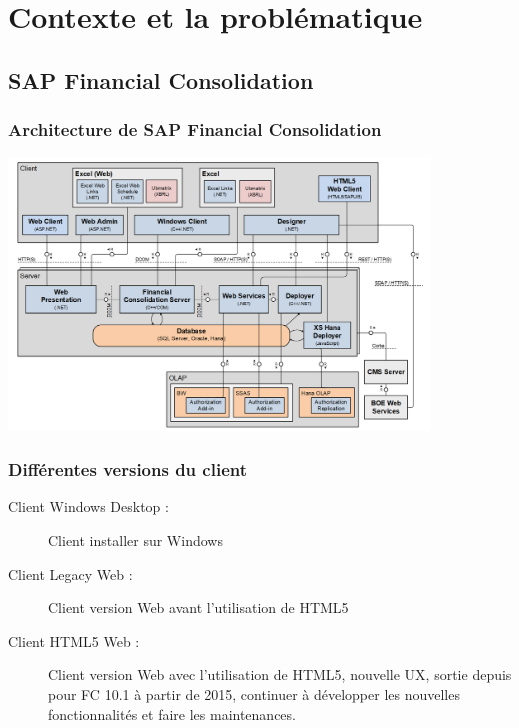 \documentclass{beamer}
\begin{document}
    \section{Contexte et la problématique}
        \subsection{SAP Financial Consolidation}
        \begin{frame}
            \frametitle{Architecture de SAP Financial Consolidation}
            \includegraphics[width=0.84\textwidth]{FC_Globale_Architecture.png}
        \end{frame}
        
        \begin{frame}
        \frametitle{Différentes versions du client}
            \begin{description}
                \item [Client Windows Desktop :] Client installer sur Windows
                \item [Client Legacy Web :] Client version Web avant l'utilisation de HTML5
                \item [Client HTML5 Web :] Client version Web avec l'utilisation de HTML5, nouvelle UX, sortie depuis pour FC 10.1 à partir de 2015, continuer à développer les nouvelles fonctionnalités et faire les maintenances.
            \end{description}
        \end{frame}
        
\end{document}
